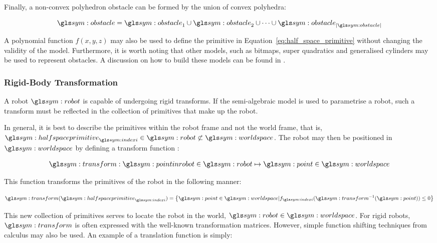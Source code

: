 		Finally, a non-convex polyhedron obstacle can be formed by the union of
		convex polyhedra:

		\begin{equation}
			\obstacle =
				\obstacle_1 \cup \obstacle_2 \cup \cdots \cup \obstacle_{\cardinality{\obstacle}}
				\label{eq:non_convex_obstacle}
		\end{equation}

		A polynomial function $f(x,y,z)$ may also be used to define the
		primitive in Equation~\ref{eq:half_space_primitive} without changing the
		validity of the model. Furthermore, it is worth noting that other
		models, such as bitmaps, super quadratics and generalised cylinders may
		be used to represent obstacles. A discussion on how to build these
		models can be found in .

		\subsubsection{Rigid-Body Transformation}%
		\label{sec:rigid_body_transformation}

			A robot $\robot$ is capable of undergoing rigid transforms. If the
			semi-algebraic model is used to parametrise a robot, such a
			transform must be reflected in the collection of primitives that
			make up the robot.

			In general, it is best to describe the primitives within the robot
			frame and not the world frame, that is,
			$\halfspaceprimitive_{\indexi} \in \robot \not\subset\world$. The
			robot may then be positioned in $\world$ by defining a transform
			function \transform:

			\begin{equation}
				\transform: \pointinrobot\in\robot \mapsto \point\in\world
			\end{equation}

			This function transforms the primitives of the robot in the
			following manner:

			\begin{equation}
				\transform(\halfspaceprimitive_{\indexi}) =
					\left\{
						\point \in \world |
							f_{\indexi}(\transform^{-1}(\point)) \leq 0
					\right\}
			\end{equation}

			This new collection of primitives serves to locate the robot in the
			world, $\robot\in\world$. For rigid robots, $\transform$ is often
			expressed with the well-known transformation matrices. However,
			simple function shifting techniques from calculus may also be used.
			An example of a translation function is simply:

